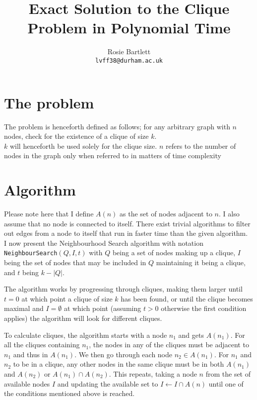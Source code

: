 \documentclass[11pt]{article}
\author{Rosie Bartlett\\\texttt{lvff38@durham.ac.uk}}
\title{Exact Solution to the Clique Problem in Polynomial Time}
\begin{document}
\maketitle


\section{The problem}
The problem is henceforth defined as follows; for any arbitrary graph with $n$ nodes, check for the existence of a clique of size $k$.\\

$k$ will henceforth be used solely for the clique size. $n$ refers to the number of nodes in the graph only when referred to in matters of time complexity

\section{Algorithm}

Please note here that I define $A(n)$ as the set of nodes adjacent to $n$. I also assume that no node is connected to itself. There exist trivial algorithms to filter out edges from a node to itself that run in faster time than the given algorithm.\\

I now present the Neighbourhood Search algorithm with notation \texttt{NeighbourSearch}$(Q, I, t)$ with $Q$ being a set of nodes making up a clique, $I$ being the set of nodes that may be included in $Q$ maintaining it being a clique, and $t$ being $k-|Q|$.

The algorithm works by progressing through cliques, making them larger until $t=0$ at which point a clique of size $k$ has been found, or until the clique becomes maximal and $I=\emptyset$ at which point (assuming $t>0$ otherwise the first condition applies) the algorithm will look for different cliques.

To calculate cliques, the algorithm starts with a node $n_1$ and gets $A(n_1)$. For all the cliques containing $n_1$, the nodes in any of the cliques must be adjacent to $n_1$ and thus in $A(n_1)$. We then go through each node $n_2\in A(n_1)$. For $n_1$ and $n_2$ to be in a clique, any other nodes in the same clique must be in both $A(n_1)$ and $A(n_2)$ or $A(n_1)\cap A(n_2)$. This repeats, taking a node $n$ from the set of available nodes $I$ and updating the available set to $I\gets I\cap A(n)$ until one of the conditions mentioned above is reached.
\end{document}
